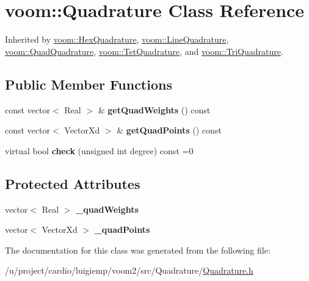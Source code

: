 \hypertarget{classvoom_1_1_quadrature}{
\section{voom::Quadrature Class Reference}
\label{classvoom_1_1_quadrature}
}


Inherited by \hyperlink{classvoom_1_1_hex_quadrature}{voom::HexQuadrature}, \hyperlink{classvoom_1_1_line_quadrature}{voom::LineQuadrature}, \hyperlink{classvoom_1_1_quad_quadrature}{voom::QuadQuadrature}, \hyperlink{classvoom_1_1_tet_quadrature}{voom::TetQuadrature}, and \hyperlink{classvoom_1_1_tri_quadrature}{voom::TriQuadrature}.\subsection*{Public Member Functions}
\begin{DoxyCompactItemize}
\item 
\hypertarget{classvoom_1_1_quadrature_a1aea9ddcd4f82b9b81d639ec111ba2ed}{
const vector$<$ Real $>$ \& {\bfseries getQuadWeights} () const }
\label{classvoom_1_1_quadrature_a1aea9ddcd4f82b9b81d639ec111ba2ed}

\item 
\hypertarget{classvoom_1_1_quadrature_a18a2ce35f8a3786a77259b7b7b589ef1}{
const vector$<$ VectorXd $>$ \& {\bfseries getQuadPoints} () const }
\label{classvoom_1_1_quadrature_a18a2ce35f8a3786a77259b7b7b589ef1}

\item 
\hypertarget{classvoom_1_1_quadrature_aca75eb4424793a057c6d27ca5194e3f0}{
virtual bool {\bfseries check} (unsigned int degree) const =0}
\label{classvoom_1_1_quadrature_aca75eb4424793a057c6d27ca5194e3f0}

\end{DoxyCompactItemize}
\subsection*{Protected Attributes}
\begin{DoxyCompactItemize}
\item 
\hypertarget{classvoom_1_1_quadrature_a1a022a3ab7fef537b0ede65787554602}{
vector$<$ Real $>$ {\bfseries \_\-quadWeights}}
\label{classvoom_1_1_quadrature_a1a022a3ab7fef537b0ede65787554602}

\item 
\hypertarget{classvoom_1_1_quadrature_a033763f1240f04e2fbe1b7272aa45c6c}{
vector$<$ VectorXd $>$ {\bfseries \_\-quadPoints}}
\label{classvoom_1_1_quadrature_a033763f1240f04e2fbe1b7272aa45c6c}

\end{DoxyCompactItemize}


The documentation for this class was generated from the following file:\begin{DoxyCompactItemize}
\item 
/u/project/cardio/luigiemp/voom2/src/Quadrature/\hyperlink{_quadrature_8h}{Quadrature.h}\end{DoxyCompactItemize}
